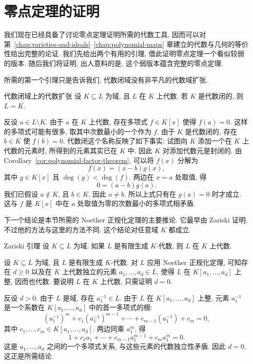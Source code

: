 \section{零点定理的证明}\label{sec:proof-of-nullstellensatz}

我们现在已经具备了讨论零点定理证明所需的代数工具, 因而可以对第~\ref{chap:varieties-and-ideals}--\ref{chap:polynomial-maps} 章建立的代数与几何的等价性给出完整的论证. 我们先给出两个有用的引理, 借此证明零点定理一个看似较弱的版本. 随后我们将证明, 出人意料的是, 这个弱版本蕴含完整的零点定理.

所需的第一个引理只是告诉我们, 代数闭域没有非平凡的代数域扩张.

\begin{Lemma}{代数闭域上的代数扩张}\leavevmode\label{lem:algebraic-extension-of-algebraically-closed-field}
设 $K\subseteq L$ 为域, 且 $L$ 在 $K$ 上代数. 若 $K$ 是代数闭的, 则 $L=K$.
\end{Lemma}
\begin{Proof}
\BookPairedNote
  {反设 $a\in L\setminus K$. 由于 $a$ 在 $K$ 上代数, 存在多项式 $f\in K[x]$ 使得 $f(a)=0$. 这样的多项式可能有很多, 取其中次数最小的一个作为 $f$. 由于 $K$ 是代数闭的, 存在 $b\in K$ 使 $f(b)=0$.}
  {\textquotedbl{}代数闭\textquotedbl{}这个名称反映了如下事实: 试图向 $K$ 添加一个在 $K$ 上代数的元素时, 所得到的元素其实已在 $K$ 中. 因此 $K$ 对\textquotedbl{}添加代数元\textquotedbl{}是封闭的.}
由 Corollary~\ref{cor:polynomial-factor-theorem}, 可以将 $f(x)$ 分解为
\[
  f(x)=(x-b)g(x),
\]
其中 $g\in K[x]$ 且 $\deg(g)<\deg(f)$. 两边在 $x=a$ 处取值, 得
\[
  0=(a-b)g(a).
\]
我们已假设 $a\notin K$, 且 $b\in K$, 因此 $a\neq b$. 所以上式只有在 $g(a)=0$ 时才成立. 这与 $f$ 是 $K[x]$ 中在 $a$ 处取值为零的次数最小的多项式相矛盾.
\end{Proof}

下一个结论是本节所需的 Noether 正规化定理的主要推论. 它最早由 Zariski 证明, 不过他的方法与这里的方法不同. 这个结论对任意域 $K$ 都成立.

\begin{Lemma}{Zariski 引理}\leavevmode\label{lem:zariski}
设 $K\subseteq L$ 为域. 如果 $L$ 是有限生成 $K$-代数, 则 $L$ 在 $K$ 上代数.
\end{Lemma}
\begin{Proof}
设 $K\subseteq L$ 为域, 且 $L$ 是有限生成 $K$-代数. 对 $L$ 应用 Noether 正规化定理, 可知存在 $d\geq0$ 以及在 $K$ 上代数独立的元素 $a_{1},\ldots,a_{d}\in L$, 使得 $L$ 在 $K[a_{1},\ldots,a_{d}]$ 上整, 因而也代数. 要说明 $L$ 在 $K$ 上代数, 只需证明 $d=0$.

反设 $d>0$. 由于 $L$ 是域, 存在 $a_{1}^{-1}\in L$. 由于 $L$ 在 $K[a_{1},\ldots,a_{d}]$ 上整, 元素 $a_{1}^{-1}$ 是一个系数在 $K[a_{1},\ldots,a_{d}]$ 中的首一多项式的根:
\[
  (a_{1}^{-1})^{m}+c_{1}(a_{1}^{-1})^{m-1}+\cdots
  +c_{m-1}(a_{1}^{-1})+c_{m}=0,
\]
其中 $c_{1},\ldots,c_{m}\in K[a_{1},\ldots,a_{d}]$. 两边同乘 $a_{1}^{m}$, 得
\[
  1+c_{1}a_{1}+\cdots+c_{m-1}a_{1}^{m-1}+c_{m}a_{1}^{m}=0.
\]
这是 $a_{1},\ldots,a_{d}$ 之间的一个多项式关系, 与这些元素的代数独立性矛盾. 因此 $d=0$, 这正是所需结论.
\end{Proof}

